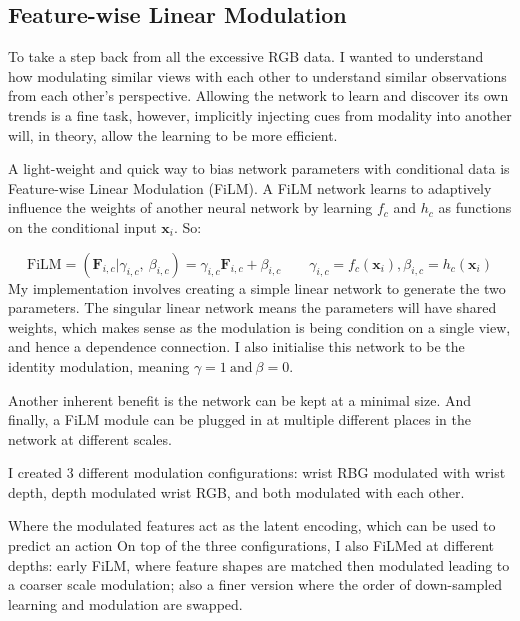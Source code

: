 \subsection{Feature-wise Linear Modulation}\label{subsec:policies-film}
To take a step back from all the excessive RGB data. I wanted to understand how modulating similar views with each other to understand similar observations from each other's perspective. Allowing the network to learn and discover its own trends is a fine task, however, implicitly injecting cues from modality into another will, in theory, allow the learning to be more efficient.


A light-weight and quick way to bias network parameters with conditional data is Feature-wise Linear Modulation (FiLM). 
A FiLM network learns to adaptively influence the weights of another neural network by learning $f_c$ and $h_c$ as functions on the conditional input $\mathbf{x}_i$. So:

\[
\text{FiLM} = \left( \mathbf{F}_{i, c} | \gamma_{i, c}, ~\beta_{i, c} \right) = \gamma_{i, c}\mathbf{F}_{i, c} + \beta_{i, c} \qquad  \gamma_{i, c} = f_c\left(\mathbf{x}_i \right), \beta_{i, c} = h_c \left( \mathbf {x}_i \right)
\]
My implementation involves  creating a simple linear network to generate the two parameters. The singular linear network means the parameters will have shared weights, which makes sense as the modulation is being condition on a single view, and hence a dependence connection. I also initialise this network to be the identity modulation, meaning \(\gamma = 1 ~\text{and} ~\beta = 0\). 

Another inherent benefit is the network can be kept at a minimal size. And finally, a FiLM module can be plugged in at multiple different places in the network at different scales. 

I created 3 different modulation configurations: wrist RBG modulated with wrist depth, depth modulated wrist RGB, and both modulated with each other. 

Where the modulated features act as the latent encoding, which can be used to predict an action On top of the three configurations, I also FiLMed at different depths: early FiLM, where feature shapes are matched then modulated leading to a coarser scale modulation; also a finer version where the order of down-sampled learning and modulation are swapped.


